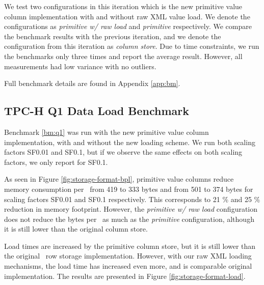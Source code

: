 We test two configurations in this iteration which is the new primitive value column implementation with and without raw XML value load. We denote the configurations as \textit{primitive w/ raw load} and \textit{primitive} respectively. We compare the benchmark results with the previous iteration, and we denote the configuration from this iteration as \textit{column store}. Due to time constraints, we run the benchmarks only three times and report the average result. However, all measurements had low variance with no outliers.

Full benchmark details are found in Appendix \ref{app:bm}.

\subsection{TPC-H Q1 Data Load Benchmark}
\label{storage-format:q1}

Benchmark \ref{bm:q1} was run with the new primitive value column implementation, with and without the new loading scheme. We run both scaling factors SF0.01 and SF0.1, but if we observe the same effects on both scaling factors, we only report for SF0.1.

As seen in Figure \ref{fig:storage-format-bpl}, primitive value columns reduce memory consumption per \lineitem~from 419 to 333 bytes and from 501 to 374 bytes for scaling factors SF0.01 and SF0.1 respectively. This corresponds to 21 \% and 25 \% reduction in memory footprint. However, the \textit{primitive w/ raw load} configuration does not reduce the bytes per \lineitem~as much as the \textit{primitive} configuration, although it is still lower than the original column store.


Load times are increased by the primitive column store, but it is still lower than the original \gap~row storage implementation. However, with our raw XML loading mechanisms, the load time has increased even more, and is comparable original implementation. The results are presented in Figure \ref{fig:storage-format-load}. 


